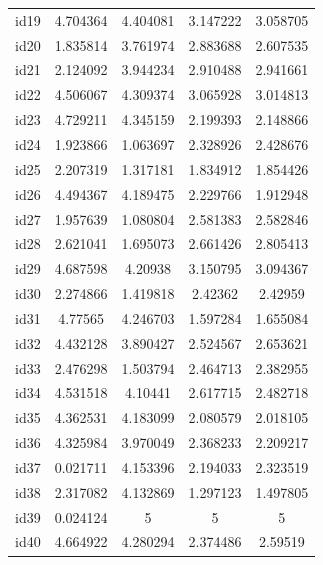 \documentclass[num-refs]{wiley-article}
\begin{document}
\begin{center}
\begin{longtable}{ccccc}
id19      & 4.704364  & 4.404081       & 3.147222          & 3.058705          \\
id20      & 1.835814  & 3.761974       & 2.883688          & 2.607535          \\
id21      & 2.124092  & 3.944234       & 2.910488          & 2.941661          \\
id22      & 4.506067  & 4.309374       & 3.065928          & 3.014813          \\
id23      & 4.729211  & 4.345159       & 2.199393          & 2.148866          \\
id24      & 1.923866  & 1.063697       & 2.328926          & 2.428676          \\
id25      & 2.207319  & 1.317181       & 1.834912          & 1.854426          \\
id26      & 4.494367  & 4.189475       & 2.229766          & 1.912948          \\
id27      & 1.957639  & 1.080804       & 2.581383          & 2.582846          \\
id28      & 2.621041  & 1.695073       & 2.661426          & 2.805413          \\
id29      & 4.687598  & 4.20938        & 3.150795          & 3.094367          \\
id30      & 2.274866  & 1.419818       & 2.42362           & 2.42959           \\
id31      & 4.77565   & 4.246703       & 1.597284          & 1.655084          \\
id32      & 4.432128  & 3.890427       & 2.524567          & 2.653621          \\
id33      & 2.476298  & 1.503794       & 2.464713          & 2.382955          \\
id34      & 4.531518  & 4.10441        & 2.617715          & 2.482718          \\
id35      & 4.362531  & 4.183099       & 2.080579          & 2.018105          \\
id36      & 4.325984  & 3.970049       & 2.368233          & 2.209217          \\
id37      & 0.021711  & 4.153396       & 2.194033          & 2.323519          \\
id38      & 2.317082  & 4.132869       & 1.297123          & 1.497805          \\
id39      & 0.024124  & 5              & 5                 & 5                 \\
id40      & 4.664922  & 4.280294       & 2.374486          & 2.59519           \\

\end{longtable}
\end{center}
\end{document}
